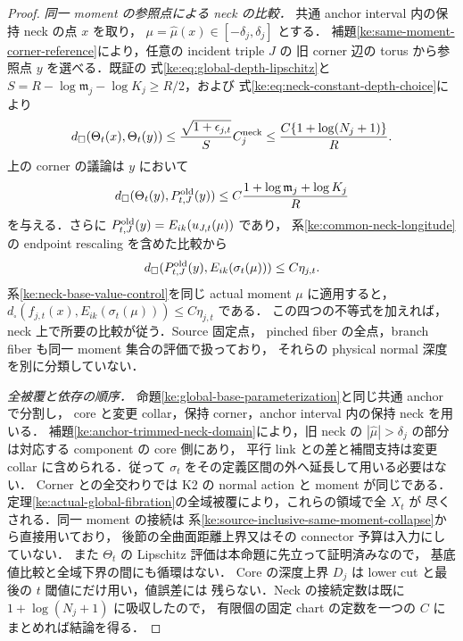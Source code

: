 \begin{proof}
\emph{同一 moment の参照点による neck の比較．}
共通 anchor interval 内の保持 neck の点 $x$ を取り，
$\mu=\widehat\mu(x)\in[-\delta_j,\delta_j]$ とする．
補題\ref{ke:same-moment-corner-reference}により，任意の incident triple $J$ の
旧 corner 辺の torus から参照点 $y$ を選べる．既証の
式\eqref{ke:eq:global-depth-lipschitz}と
$S=R-\log\mathfrak m_j-\log K_j\ge R/2$，および
式\eqref{ke:eq:neck-constant-depth-choice}により
\[
 d_\square(\Theta_t(x),\Theta_t(y))
 \le\frac{\sqrt{1+\epsilon_{j,t}}}{S}C_j^{\rm neck}
 \le\frac{C\{1+\log(N_j+1)\}}R .
\]
上の corner の議論は $y$ において
\[
 d_\square(\Theta_t(y),P^{\rm old}_{t,J}(y))
 \le C\frac{1+\log\mathfrak m_j+\log K_j}R
\]
を与える．さらに $P^{\rm old}_{t,J}(y)=E_{ik}(u_{J,t}(\mu))$ であり，
系\ref{ke:common-neck-longitude}の endpoint rescaling を含めた比較から
\[
 d_\square(P^{\rm old}_{t,J}(y),E_{ik}(\sigma_t(\mu)))\le C\eta_{j,t}.
\]
系\ref{ke:neck-base-value-control}を同じ actual moment $\mu$ に適用すると，
$d_\square(f_{j,t}(x),E_{ik}(\sigma_t(\mu)))\le C\eta_{j,t}$ である．
この四つの不等式を加えれば，neck 上で所要の比較が従う．Source 固定点，
pinched fiber の全点，branch fiber も同一 moment 集合の評価で扱っており，
それらの physical normal 深度を別に分類していない．

\emph{全被覆と依存の順序．}
命題\ref{ke:global-base-parameterization}と同じ共通 anchor で分割し，
core と変更 collar，保持 corner，anchor interval 内の保持 neck を用いる．
補題\ref{ke:anchor-trimmed-neck-domain}により，旧 neck の
$|\widehat\mu|>\delta_j$ の部分は対応する component の core 側にあり，
平行 link との差と補間支持は変更 collar に含められる．従って
$\sigma_t$ をその定義区間の外へ延長して用いる必要はない．
Corner との全交わりでは K2 の normal action と moment が同じである．
定理\ref{ke:actual-global-fibration}の全域被覆により，これらの領域で全 $X_t$ が
尽くされる．同一 moment の接続は
系\ref{ke:source-inclusive-same-moment-collapse}から直接用いており，
後節の全曲面距離上界又はその connector 予算は入力にしていない．
また $\Theta_t$ の Lipschitz 評価は本命題に先立って証明済みなので，
基底値比較と全域下界の間にも循環はない．
Core の深度上界 $D_j$ は lower cut と最後の $t$ 閾値にだけ用い，値誤差には
残らない．Neck の接続定数は既に $1+\log(N_j+1)$ に吸収したので，
有限個の固定 chart の定数を一つの $C$ にまとめれば結論を得る．
\end{proof}

